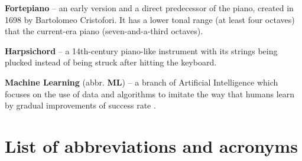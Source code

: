 \documentclass[a4paper, 11pt, twoside]{report}
\theoremstyle{definition}
\begin{document}
\vskip5pt \noindent
\textbf{Fortepiano} -- an early version and a direct predecessor of the piano, created in 1698 by Bartolomeo Cristofori. It has a lower tonal range (at least four octaves) that the current-era piano (seven-and-a-third octaves).

\vskip5pt \noindent
\textbf{Harpsichord} -- a 14th-century piano-like instrument with its strings being plucked instead of being struck after hitting the keyboard.

\vskip5pt \noindent
\textbf{Machine Learning} (abbr. \textbf{ML}) -- a branch of Artificial Intelligence which focuses on the use of data and algorithms to imitate the way that humans learn by gradual improvements of success rate \cite{ML_IBM}.

\newpage


\chapter*{List of abbreviations and acronyms}
\end{document}
